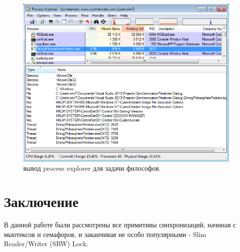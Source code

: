 \documentclass[a4paper, 12pt]{article}		%
\begin{document}
\begin{figure}[h!]
\centering
\includegraphics[scale=0.7]{res/pe_10}
\caption{вывод process explorer для задачи философов.}
\end{figure}

\newpage
\section*{Заключение}

В данной работе были рассмотрены все примитивы синхронизаций, начиная с мьютексов и семафоров, и заканчивая не особо популярными - Slim Reader/Writer (SRW) Lock.
\end{document}
